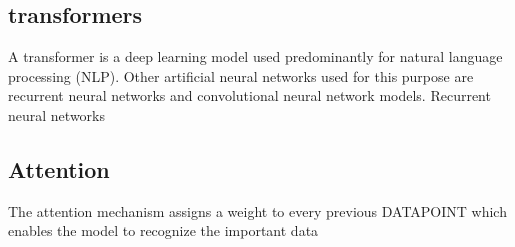 \documentclass[
	english,
	ruledheaders=section,
	class=report,
	thesis={type=bachelor},
	accentcolor=9c,
	custommargins=true,
	marginpar=false,
	parskip=half-,
	fontsize=11pt,
]{tudapub}
\begin{document}
\subsection{transformers}
A transformer is a deep learning model used predominantly for natural language processing (NLP). Other artificial neural networks used for this purpose are recurrent neural networks and convolutional neural network models. Recurrent neural networks



\subsection{Attention}
The attention mechanism assigns a weight to every previous DATAPOINT which enables the model to recognize the important data







 
%


\printbibliography
\end{document}
